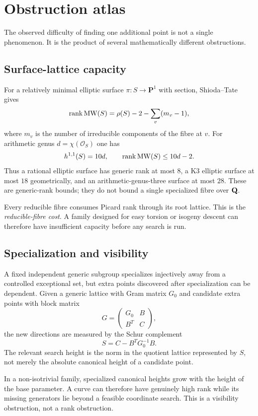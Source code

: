 \section{Obstruction atlas}

The observed difficulty of finding one additional point is not a single
phenomenon.  It is the product of several mathematically different
obstructions.

\subsection{Surface-lattice capacity}

For a relatively minimal elliptic surface $\pi:S\to\mathbf P^1$ with section,
Shioda--Tate gives
\[
\operatorname{rank} \operatorname{MW}(S)=\rho(S)-2-\sum_v(m_v-1),
\]
where $m_v$ is the number of irreducible components of the fibre at $v$.
For arithmetic genus $d=\chi(\mathcal O_S)$ one has
\[
h^{1,1}(S)=10d,
\qquad
\operatorname{rank}\operatorname{MW}(S)\le10d-2.
\]
Thus a rational elliptic surface has generic rank at most $8$, a K3 elliptic
surface at most $18$ geometrically, and an arithmetic-genus-three surface at
most $28$.  These are generic-rank bounds; they do not bound a single
specialized fibre over $\mathbf Q$.

Every reducible fibre consumes Picard rank through its root lattice.  This is
the \emph{reducible-fibre cost}.  A family designed for easy torsion or
isogeny descent can therefore have insufficient capacity before any search is
run.

\subsection{Specialization and visibility}

A fixed independent generic subgroup specializes injectively away from a
controlled exceptional set, but extra points discovered after specialization
can be dependent.  Given a generic lattice with Gram matrix $G_0$ and
candidate extra points with block matrix
\[
G=\begin{pmatrix}G_0&B\\B^T&C\end{pmatrix},
\]
the new directions are measured by the Schur complement
\[
S=C-B^TG_0^{-1}B.
\]
The relevant search height is the norm in the quotient lattice represented by
$S$, not merely the absolute canonical height of a candidate point.

In a non-isotrivial family, specialized canonical heights grow with the height
of the base parameter.  A curve can therefore have genuinely high rank while
its missing generators lie beyond a feasible coordinate search.  This is a
visibility obstruction, not a rank obstruction.

